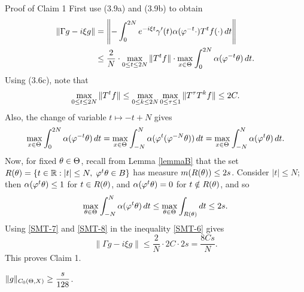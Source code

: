 \begin{pf}
\begin{pf*}{Proof of Claim 1} First use (3.9a) and (3.9b) to obtain
\begin{equation}\lb{SMT-6}
\begin{aligned}
\|\Gamma g-i\xi g\| &= \left\|-\int^{2N}_0 e^{-i\xi t}\gamma'(t)
   \alpha(\vphi^{-t}\cdot)T^tf(\cdot)\,dt \right\| \\
&\le \dfrac{2}{N}\cdot \max_{0\le t\le 2N} \|T^tf\|
   \cdot \max_{x\in \TH} \int^{2N}_0 \alpha(\vphi^{-t}\th)\,dt.
\end{aligned}
\end{equation}
Using (3.6c), note that
\begin{equation}\lb{SMT-7}
\max_{0\le t\le 2N} \|T^tf\|
   \le \max_{0\le k\le 2N}\max_{0\le \tau\le 1}
   \|T^{\tau}T^kf\| \le 2C.
\end{equation}
Also, the change of variable $t\mapsto -t+N$ gives
\[
\max_{x\in \TH}\int^{2N}_0\alpha(\vphi^{-t}\th)\,dt
=\max_{x\in \TH}\int^N_{-N}\alpha(\vphi^t(\vphi^{-N}\th))\,dt
=\max_{x\in \TH}\int^N_{-N} \alpha(\vphi^t\th)\,dt.
\]
Now, for fixed $\theta\in \Theta$, recall from Lemma \ref{lemmaB} that the set
$R(\theta)=\{t\in{\Bbb{R}}: |t|\le N,\;\varphi^t\theta\in B\}$
 has measure $m(R(\theta))\le 2s$.
Consider $|t|\le N$; then $\alpha(\varphi^t\theta)\le 1$ for $t\in R(\theta)$,
and $\alpha(\varphi^t\theta)=0$ for $t\notin R(\theta)$, and so
\begin{equation}\lb{SMT-8}
\max_{\th\in \TH} \int^N_{-N} \alpha(\vphi^t\th)\,dt
\le \max_{\th\in \TH}\int_{R(\th)}dt \le 2s.
\end{equation}
Using \eqref{SMT-7} and \eqref{SMT-8} in the inequality \eqref{SMT-6}
gives
$$
\|\Gamma g-i\xi g\| \le \dfrac{2}{N}\cdot 2C\cdot 2s
= \dfrac{8Cs}{N}.
$$
This proves Claim 1.
\end{pf*}

\begin{claimtwo}  $\displaystyle{\|g\|_{C_0(\Theta,X)}\ge \frac{s}{128} }$.
\end{claimtwo}


\end{pf}
